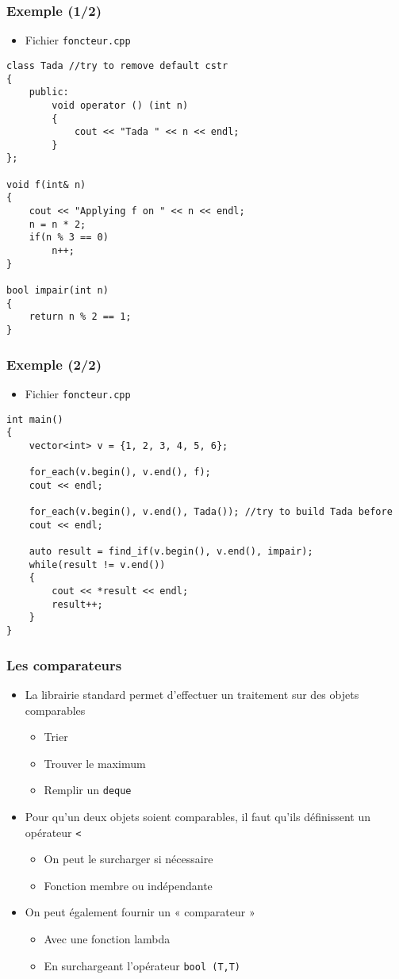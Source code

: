 \begin{frame}[containsverbatim]
\frametitle{Exemple (1/2)}
\begin{itemize}
\item Fichier \texttt{foncteur.cpp}
\end{itemize}
\begin{lstlisting}
class Tada //try to remove default cstr
{
	public:
		void operator () (int n)
		{
			cout << "Tada " << n << endl;
		}
};

void f(int& n)
{
	cout << "Applying f on " << n << endl;
	n = n * 2;
	if(n % 3 == 0)
		n++;
}

bool impair(int n)
{
	return n % 2 == 1;
}
\end{lstlisting}
\end{frame}

\begin{frame}[containsverbatim]
\frametitle{Exemple (2/2)}
\begin{itemize}
\item Fichier \texttt{foncteur.cpp}
\end{itemize}
\begin{lstlisting}
int main()
{	
	vector<int> v = {1, 2, 3, 4, 5, 6};	

	for_each(v.begin(), v.end(), f);
	cout << endl;

	for_each(v.begin(), v.end(), Tada()); //try to build Tada before
	cout << endl;

	auto result = find_if(v.begin(), v.end(), impair);
	while(result != v.end())
	{
		cout << *result << endl;
		result++;
	}
}
\end{lstlisting}
\end{frame}

\begin{frame}
\frametitle{Les comparateurs}
\begin{itemize}[<+->]
\item La librairie standard permet d'effectuer un traitement sur des objets comparables
	\begin{itemize}
	\item Trier
	\item Trouver le maximum
	\item Remplir un \texttt{deque}
	\end{itemize}
\item Pour qu'un deux objets soient comparables, il faut qu'ils définissent un opérateur \texttt{<}
	\begin{itemize}
	\item On peut le surcharger si nécessaire
	\item Fonction membre ou indépendante
	\end{itemize}
\item On peut également fournir un « comparateur »
	\begin{itemize}
	\item Avec une fonction lambda
	\item En surchargeant l'opérateur \texttt{bool (T,T)}
	\end{itemize}
\end{itemize}
\end{frame}

